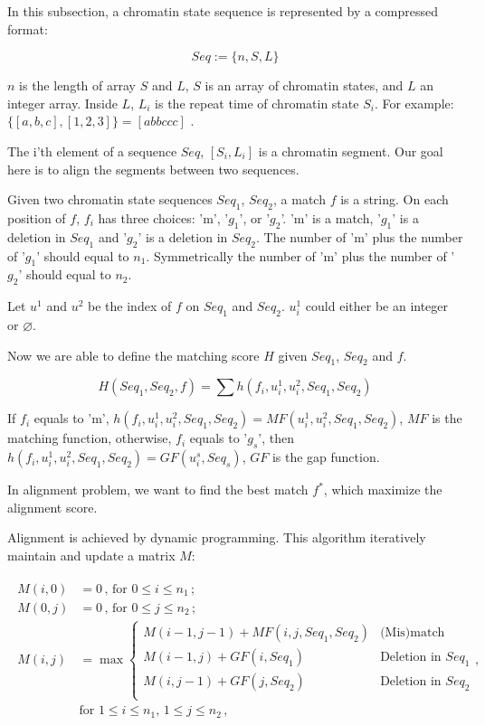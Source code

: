 \documentclass[a4paper]{article}
\begin{document}
\begin{CJK*}{UTF8}{kai}
In this subsection, a chromatin state sequence is represented by a compressed format: 

$$Seq := \{n,S,L\}$$

$n$ is the length of array $S$ and $L$, $S$ is an array of chromatin states, and $L$ an integer array. Inside $L$, $L_i$ is the repeat time of chromatin state $S_i$. For example: $\{[a,b,c],[1,2,3]\} = [abbccc]$ .

The i'th element of a sequence $Seq$, $[S_i,L_i]$ is a chromatin segment. Our goal here is to align the segments between two sequences.

Given two chromatin state sequences $Seq_1$, $Seq_2$, a match $f$ is a string. On each position of $f$, $f_i$ has three choices: 'm', '$g_1$', or '$g_2$'. 'm' is a match, '$g_1$' is a deletion in $Seq_1$ and '$g_2$' is a deletion in $Seq_2$. The number of 'm' plus the number of '$g_1$' should equal to $n_1$. Symmetrically the number of 'm' plus the number of '$g_2$' should equal to $n_2$. 

Let $u^1$ and $u^2$ be the index of $f$ on $Seq_1$ and $Seq_2$. $u^1_i$ could either be an integer or $\varnothing$.

Now we are able to define the matching score $H$ given $Seq_1$, $Seq_2$ and $f$.

$$H(Seq_1,Seq_2,f) = \sum{h(f_i,u^1_i,u^2_i,Seq_1,Seq_2)}$$

If $f_i$ equals to 'm', $h(f_i,u^1_i,u^2_i,Seq_1,Seq_2) = MF(u^1_i,u^2_i,Seq_1,Seq_2)$, $MF$ is the matching function, otherwise, $f_i$ equals to '$g_s$', then $h(f_i,u^1_i,u^2_i,Seq_1,Seq_2) = GF(u^s_i,Seq_s)$, $GF$ is the gap function.

In alignment problem, we want to find the best match $f^*$, which maximize the alignment score.

Alignment is achieved by dynamic programming. This algorithm iteratively maintain and update a matrix $M$:

\begin{align}
\begin{split}
M(i,0)&=0\,,\, \text{for } 0 \leq i \leq n_1\,;\\ 
M(0,j)&=0\,,\, \text{for } 0 \leq j \leq n_2\,;\\ 
M(i,j)&=\max \left\{ \begin{array}{ll}
M(i-1,j-1)+MF\left(i,j,Seq_1,Seq_2\right) &  \text{(Mis)match} \\
M(i-1,j)+GF(i,Seq_1) & \text{Deletion in } Seq_1 \\
M(i,j-1)+GF(j,Seq_2) & \text{Deletion in } Seq_2 \\
\end{array},\, \right. \\ 
& \text{for }  1 \leq i \leq n_1,\, 1 \leq j \leq n_2\,,
\end{split} 
\end{align}


\end{CJK*}
\end{document}
